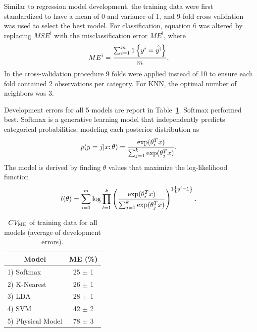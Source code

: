 \documentclass[twocolumn,10pt]{article}
\begin{document}
Similar to regression model development, the training data were first standardized to have a mean of 0 and variance of 1, and 9-fold cross validation was used to select the best model. For classification, equation 6 was altered by replacing $MSE^{i}$ with the misclassification error $ME^{i}$, where
\begin{equation} \label{eq:10}
ME^{i} = \frac{\sum_{i=1}^{m} 1\left\{y^{i}=\hat{y^{i}}\right\}}{m} \\.
\end{equation}
In the cross-validation procedure 9 folds were applied instead of 10 to ensure each fold contained 2 observations per category. For KNN, the optimal number of neighbors was 3.
 
Development errors for all 5 models are report in Table~\ref{t:regressionDevError}. Softmax performed best. Softmax is a generative learning model that independently predicts categorical probabilities, modeling each posterior distribution as
\begin{equation} \label{eq:11}
p(y=j|x;\theta) = \frac{\exp(\theta^{T}_{i}x)}{\sum_{j=1}^{k} \exp(\theta^{T}_{j}x)} \\.
\end{equation}
The model is derived by finding $\theta$ values that maximize the log-likelihood function
\begin{equation} \label{eq:12}
l(\theta) = \sum_{i=1}^{m}\log\prod_{l=1}^{k} \left (\frac{\exp(\theta^{T}_{i}x)}{\sum_{j=1}^{k} \exp(\theta^{T}_{j}x)}  \right )^{1\left \{y^{i}=1 \right \}} \\.
\end{equation}

\begin{table}
\begin{center}
\begin{tabular}{|c|c|}
\hline
 Model & ME (\%)\\
\hline
 \multicolumn{1}{|l|}{1) Softmax} & 25 $\pm$ 1\\
  \hline
 \multicolumn{1}{|l|}{2) K-Nearest} & 26 $\pm$ 1\\
 \hline
 \multicolumn{1}{|l|}{3) LDA} & 28 $\pm$ 1\\
  \hline
 \multicolumn{1}{|l|}{4) SVM} & 42 $\pm$ 2\\
 \hline
 \multicolumn{1}{|l|}{5) Physical Model} & 78 $\pm$ 3\\
 \hline
\end{tabular}
\caption{$CV_{\hbox{\scriptsize ME}}$ of training data for all models (average of development errors).}
\label{t:regressionDevError}
\end{center}
\end{table}
\end{document}
